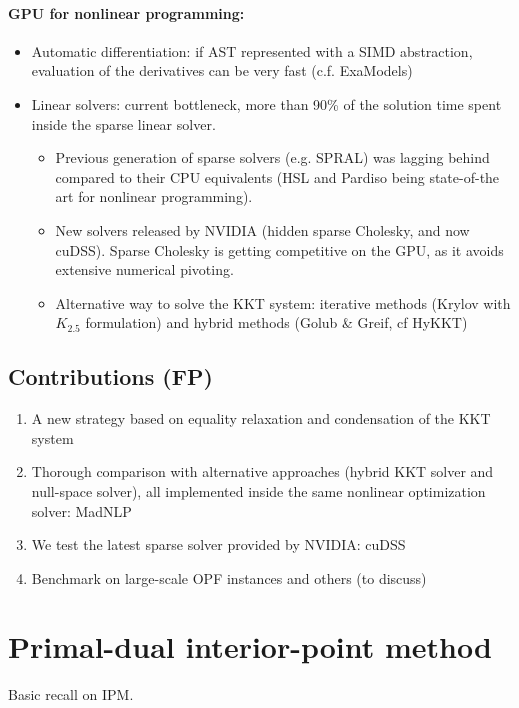 \documentclass{article}
\theoremstyle{definition}
\theoremstyle{remark}
\begin{document}
\paragraph{GPU for nonlinear programming:}
\begin{itemize}
  \item Automatic differentiation: if AST represented with a SIMD abstraction,
    evaluation of the derivatives can be very fast (c.f. ExaModels)
  \item Linear solvers: current bottleneck, more than 90\% of the solution time spent
    inside the sparse linear solver.
    \begin{itemize}
      \item Previous generation of sparse solvers (e.g. SPRAL)
        was lagging behind compared to their CPU equivalents (HSL and
        Pardiso being state-of-the art for nonlinear programming).
      \item New solvers released by NVIDIA (hidden sparse Cholesky, and now cuDSS).
        Sparse Cholesky is getting competitive on the GPU, as it avoids
        extensive numerical pivoting.
      \item Alternative way to solve the KKT system:
        iterative methods (Krylov with $K_{2.5}$ formulation)
        and hybrid methods (Golub \& Greif, cf HyKKT)
    \end{itemize}
\end{itemize}

\subsection{Contributions (FP)}
\begin{enumerate}
  \item A new strategy based on equality relaxation
    and condensation of the KKT system
  \item Thorough comparison with alternative approaches
    (hybrid KKT solver and null-space solver), all implemented
    inside the same nonlinear optimization solver: MadNLP
  \item We test the latest sparse solver provided
    by NVIDIA: cuDSS
  \item Benchmark on large-scale OPF instances
    and others (to discuss)
\end{enumerate}


\section{Primal-dual interior-point method}
Basic recall on IPM.
\end{document}
